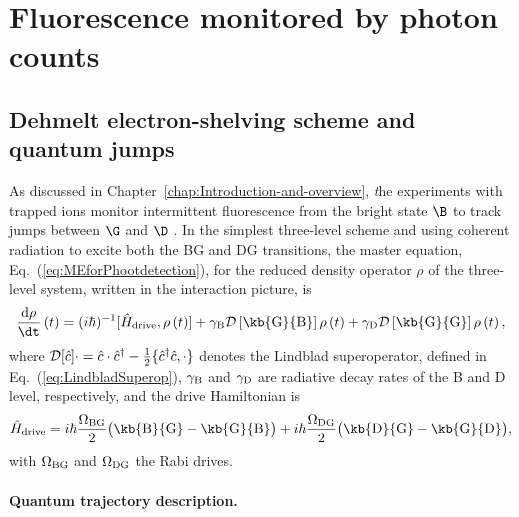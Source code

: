 \section{Fluorescence monitored by photon counts \label{sec:Fluorescence-monitored-by}}

\subsection{Dehmelt electron-shelving scheme and quantum jumps \label{sec:thry:3lvl-atom-simple-log}}

As discussed in Chapter~\ref{chap:Introduction-and-overview}, \textit{\emph{t}}he
experiments with trapped ions \citep{Nagourney1986,Sauter1986,Bergquist1986}
monitor intermittent fluorescence from the bright state $\B$ to track
jumps between $\G$ and $\D$ \citep{Cook1985}. In the simplest three-level
scheme \citep{Bergquist1986} and using coherent radiation to excite
both the BG and DG transitions, the master equation, Eq.~(\ref{eq:MEforPhootdetection}),
for the reduced density operator $\rho$ of the three-level system,
written in the interaction picture, is
\begin{equation}
\frac{\mathrm{d}\rho}{\dt}\left(t\right)=(i\hbar)^{-1}[\hat{H}_{{\rm drive}},\rho\left(t\right)]+\gamma_{{\rm B}}{\cal D}\left[\kb{\mathrm{G}}{\mathrm{B}}\right]\rho\left(t\right)+\gamma_{{\rm D}}{\cal D}\left[\kb{\mathrm{G}}{\mathrm{G}}\right]\rho\left(t\right),\label{eq:PhotonLindblad}
\end{equation}
where ${\cal D}[\hat{c}]\cdot=\hat{c}\cdot\hat{c}^{\dagger}-\frac{1}{2}\{\hat{c}^{\dagger}\hat{c},\cdot\}$
denotes the Lindblad superoperator, defined in Eq.~(\ref{eq:LindbladSuperop}),
$\gamma_{{\rm B}}$ and $\gamma_{{\rm D}}$ are radiative decay rates
of the B and D level, respectively, and the drive Hamiltonian is
\begin{equation}
\hat{H}_{{\rm drive}}=i\hbar\frac{\Omega_{{\rm BG}}}{2}\big(\kb{\mathrm{B}}{\mathrm{G}}-\kb{\mathrm{G}}{\mathrm{B}}\big)+i\hbar\frac{\Omega_{{\rm DG}}}{2}\big(\kb{\mathrm{D}}{\mathrm{G}}-\kb{\mathrm{G}}{\mathrm{D}}\big),\label{eq:drive_coherent_fluorescence}
\end{equation}
with $\Omega_{{\rm BG}}$ and $\Omega_{{\rm DG}}$ the Rabi drives.

\paragraph{Quantum trajectory description.}

